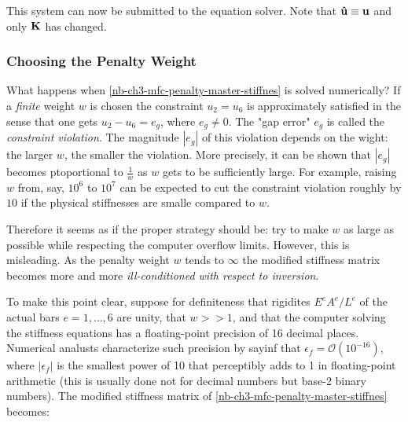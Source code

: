 This system can now be submitted to the equation solver. Note that
$ \mathbf{\hat{u}} \equiv \mathbf{u} $ and only $ \mathbf{K} $ has changed.

\subsubsection{Choosing the Penalty Weight}

What happens when \eqref{nb-ch3-mfc-penalty-master-stiffnes} is solved numerically?
If a \textit{finite} weight $ w $ is chosen the constraint $ u_2 = u_6 $ is
approximately satisfied in the sense that one gets $ u_2 - u_6 = e_g $, where
$ e_g \neq 0 $. The "gap error" $ e_g $ is called the \textit{constraint violation}.
The magnitude $ \left| e_g \right| $ of this violation depends on the wight:
the larger $ w $, the smaller the violation. More precisely, it can be shown
that $ | e_g | $ becomes ptoportional to $ \frac{1}{w} $ as $ w $ gets to be
sufficiently large. For example, raising $ w $ from, say, $ 10^6 $ to $ 10^7 $
can be expected to cut the constraint violation roughly by $ 10 $ if the physical
stiffnesses are smalle compared to $ w $.

Therefore it seems as if the proper strategy should be: try to make $ w $ as large
as possible while respecting the computer overflow limits. However, this is misleading.
As the penalty weight $ w $ tends to $ \infty $ the modified stiffness matrix becomes
more and more \textit{ill-conditioned with respect to inversion}.

To make this point clear, suppose for definiteness that rigidites
$ E^e A^e / L^e $ of the actual bars $ e = 1, \dots, 6 $ are unity, that
$ w >> 1 $, and that the computer solving the stiffness equations has a
floating-point precision of 16 decimal places. Numerical analusts characterize such
precision by sayinf that $ \epsilon_f = \mathcal{O}(10^{-16}) $, where
$ | \epsilon_f | $ is the smallest power of 10 that perceptibly adds to 1 in
floating-point arithmetic (this is usually done not for decimal numbers but
base-2 binary numbers). The modified stiffness matrix of \eqref{nb-ch3-mfc-penalty-master-stiffnes}
becomes:

